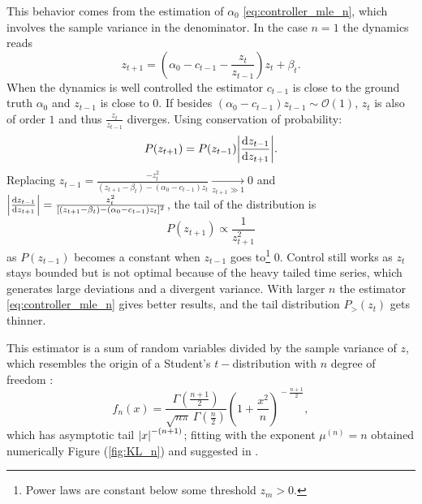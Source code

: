 \documentclass[FinalReport.tex]{subfiles}
\begin{document}
This behavior comes from the estimation of $\alpha_0$ \eqref{eq:controller_mle_n}, which involves the sample variance in the denominator. In the case $n=1$ the dynamics reads
\begin{equation}\label{eq:dyn_n=1}
	z_{t+1}=\left(\alpha_0-c_{t-1}-\frac{z_t}{z_{t-1}} \right)z_t + \beta_t.	
\end{equation}
When the dynamics is well controlled the estimator $c_{t-1}$ is close to the ground truth $\alpha_0$ and $z_{t-1}$ is close to $0$. If besides $(\alpha_0-c_{t-1})z_{t-1}\sim\mathcal{O}(1)$, $z_t$ is also of order $1$ and thus $\frac{z_t}{z_{t-1}}$ diverges.
Using conservation of probability:
\begin{equation}
	P(z_{t+1})=P(z_{t-1})\abs{\frac{\dd{z_{t-1}}}{\dd{z_{t+1}}} }.
\end{equation}
Replacing $z_{t-1}=\frac{-z_t^2}{(z_{t+1}-\beta_t)-(\alpha_0-c_{t-1})z_t}\underset{z_{t+1}\gg1}{\longrightarrow}0$ and $\abs{\frac{\dd{z_{t-1}}}{\dd{z_{t+1}}} }=\frac{z_t^2}{[(z_{t+1}-\beta_t)-(\alpha_0-c_{t-1})z_t]^2}$, the tail of the distribution is
\begin{equation}\label{eq:tail_p(z)_n=1}
	P(z_{t+1})\propto \frac{1}{z_{t+1}^{2}}
\end{equation}
as $P(z_{t-1})$ becomes a constant when $z_{t-1}$ goes to\footnote{Power laws are constant below some threshold $z_m>0$.} $0$.
Control still works as $z_t$ stays bounded but is not optimal because of the heavy tailed time series, which generates large deviations and a divergent variance.
With larger $n$ the estimator \eqref{eq:controller_mle_n} gives better results, and the tail distribution $P_>(z_t)$ gets thinner. 

This estimator is a sum of random variables divided by the sample variance of $z$, which resembles the origin of a Student's $t-$distribution with $n$ degree of freedom \cite{CritPhenom}:
\begin{equation}
	f_n(x) = \frac{\Gamma(\frac{n+1}{2})} {\sqrt{n\pi}\,\Gamma(\frac{n}{2})} \left(1+\frac{x^2}{n} \right)^{\!-\frac{n+1}{2}},
\end{equation}
which has asymptotic tail $\abs{x}^{-(n+1)}$; fitting with the exponent $\mu^{(n)}=n$ obtained numerically Figure (\ref{fig:KL_n}) and suggested in \cite{OptCont}.
\end{document}
